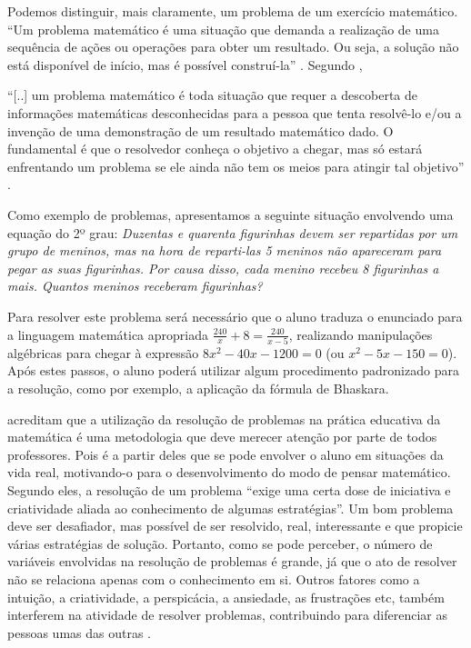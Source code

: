 Podemos distinguir, mais claramente, um problema de um exercício matemático. ``Um problema matemático é uma situação que demanda a realização de uma sequência de ações ou operações para obter um resultado. Ou seja, a solução não está disponível de início, mas é possível construí-la'' \cite[p.~4]{nacionais1998terceiro}. Segundo , 

\begin{citacao}
``[..] um problema matemático é toda situação que requer a descoberta de informações matemáticas desconhecidas para a pessoa que tenta resolvê-lo e/ou a invenção de uma 
demonstração de um resultado matemático dado. O fundamental é que o resolvedor conheça o objetivo a chegar, mas só estará enfrentando um
problema se ele ainda não tem os meios para atingir tal objetivo'' . 
\end{citacao}

Como exemplo de problemas, apresentamos a seguinte situação envolvendo uma equação do 2º grau: \textit{Duzentas e quarenta figurinhas devem 
ser repartidas por um grupo de meninos, mas na hora de reparti-las 5 meninos não apareceram para pegar as suas figurinhas. Por causa disso, 
cada menino recebeu 8 figurinhas a mais. Quantos meninos receberam figurinhas?}

Para resolver este problema será necessário que o aluno traduza o enunciado para a linguagem matemática apropriada $\frac{240}{x} + 8 = 
\frac{240}{x-5}$, realizando manipulações algébricas para chegar à expressão $8x^{2}-40x-1200=0$ (ou $x^{2}-5x-150=0$). Após estes 
passos, o aluno poderá utilizar algum procedimento padronizado para a resolução, como por exemplo, a aplicação da fórmula de Bhaskara.

 acreditam que a utilização da resolução de problemas na pr\'atica educativa da matemática \'e
uma metodologia que deve merecer atenção por parte de todos professores. Pois \'e a partir deles que se pode envolver o aluno em situações 
da vida real, motivando-o para o desenvolvimento do modo de pensar matemático. Segundo eles, a resolução de um problema 
``exige uma certa dose de iniciativa e criatividade aliada ao conhecimento de algumas estratégias''. Um bom problema deve ser 
desafiador, mas possível de ser resolvido, real, interessante e que propicie várias estratégias de solução. Portanto, como se pode 
perceber, o número de variáveis envolvidas na resolução de problemas é grande, já que o ato de resolver não se relaciona apenas 
com o conhecimento em si. Outros fatores como a intuição, a criatividade, a perspicácia, a ansiedade, as frustrações etc, também interferem 
na atividade de resolver problemas, contribuindo para diferenciar as pessoas umas das outras \cite{mirian2001resolucao}. 

